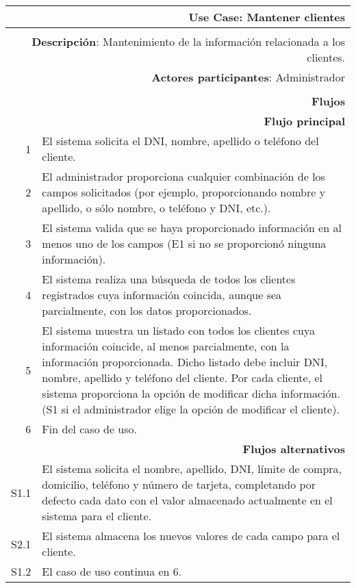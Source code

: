 \begin{tabularx}{\textwidth}{| r | X |}
\hline
\multicolumn{2}{|X|}{
\textbf{Use Case}: Mantener clientes} \\

\hline
\multicolumn{2}{|c|}{\cellcolor[gray]{0.6}} \\

\hline
\multicolumn{2}{|X|}{
\textbf{Descripción}: Mantenimiento de la información relacionada a los
clientes.} \\

\hline
\multicolumn{2}{|X|}{
\textbf{Actores participantes}: Administrador} \\

\hline
\multicolumn{2}{|c|}{\cellcolor[gray]{0.6} } \\

\hline
\multicolumn{2}{|X|}{
\textbf{Flujos}} \\

\hline
\multicolumn{2}{|X|}{
\textbf{Flujo principal}} \\

\hline
1 & El sistema solicita el DNI, nombre, apellido o teléfono del cliente. \\
\hline
2 & El administrador proporciona cualquier combinación de los campos
solicitados (por ejemplo, proporcionando nombre y apellido, o sólo nombre, o
teléfono y DNI, etc.). \\
\hline
3 & El sistema valida que se haya proporcionado información en al menos uno de
los campos (E1 si no se proporcionó ninguna información). \\
\hline
4 & El sistema realiza una búsqueda de todos los clientes registrados cuya
información coincida, aunque sea parcialmente, con los datos proporcionados. \\
\hline
5 & El sistema muestra un listado con todos los clientes cuya información
coincide, al menos parcialmente, con la información proporcionada. Dicho
listado debe incluir DNI, nombre, apellido y teléfono del cliente. Por cada
cliente, el sistema proporciona la opción de modificar dicha información. (S1
si el administrador elige la opción de modificar el cliente). \\
\hline
6 & Fin del caso de uso. \\

\hline
\multicolumn{2}{|X|}{
\textbf{Flujos alternativos}} \\

\hline
S1.1 & El sistema solicita el nombre, apellido, DNI, límite de compra,
domicilio, teléfono y número de tarjeta, completando por defecto cada dato con
el valor almacenado actualmente en el sistema para el cliente. \\
\hline
S2.1 & El sistema almacena los nuevos valores de cada campo para el cliente. \\
\hline
S1.2 & El caso de uso continua en 6. \\

\hline
\end{tabularx}

